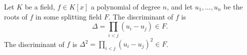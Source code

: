 Let $K$ be a field, $f \in K[x]$ a polynomial of degree $n$, and let $u_1, \ldots, u_n$ be the roots of $f$ in some splitting field $F$. The discriminant of $f$ is
$$\Delta = \prod_{i < j} (u_i - u_j) \in F.$$
The discriminant of $f$ is $\Delta^2 = \prod_{i < j} (u_i - u_j)^2 \in F$.
